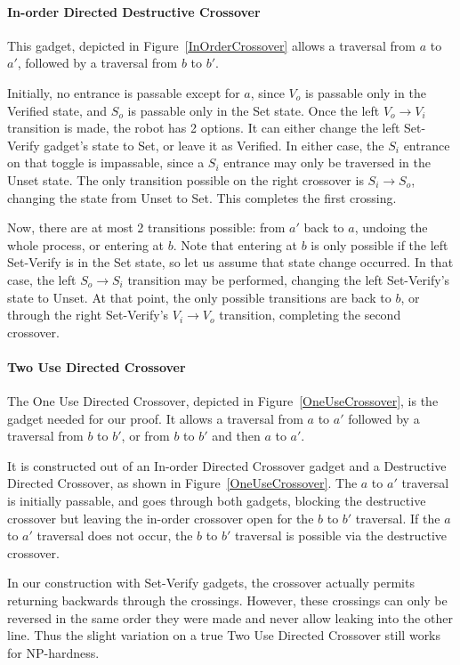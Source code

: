 \paragraph{In-order Directed Destructive Crossover} This gadget, depicted in Figure~\ref{InOrderCrossover} allows a traversal from $a$ to $a'$, followed by a traversal from $b$ to $b'$.

Initially, no entrance is passable except for $a$, since $V_o$ is passable only in the Verified state, and $S_o$ is
passable only in the Set state. Once the left $V_o \rightarrow V_i$ transition is made, the robot has 2 options.
It can either change the left Set-Verify gadget's state to Set, or leave it as Verified. In either case, the $S_i$
entrance on that toggle is impassable, since a $S_i$ entrance may only be traversed in the Unset state. The
only transition possible on the right crossover is $S_i \rightarrow S_o$, changing the state from Unset to Set.
This completes the first crossing.

Now, there are at most 2 transitions possible: from $a'$ back to $a$, undoing the whole process, or entering at $b$. Note that entering at $b$ is only possible if the left Set-Verify is in the Set state, so let us assume that state change occurred. In that case, the left $S_o \rightarrow S_i$ transition may be performed, changing the left Set-Verify's state to Unset. At that point, the only possible transitions are back to $b$, or through the right Set-Verify's
$V_i \rightarrow V_o$ transition, completing the second crossover.


\paragraph{Two Use Directed Crossover} 
The One Use Directed Crossover, depicted in Figure~\ref{OneUseCrossover}, is the gadget needed for our proof. It allows a traversal from $a$ to $a'$ followed by a traversal from $b$ to $b'$, or from $b$ to $b'$ and then $a$ to $a'$.

It is constructed out of an In-order Directed Crossover gadget and a Destructive Directed Crossover, as shown in Figure~\ref{OneUseCrossover}. The $a$ to $a'$ traversal is initially passable, and goes through both gadgets,
blocking the destructive crossover but leaving the in-order crossover open for the $b$ to $b'$ traversal. If the $a$ to $a'$ traversal does not occur, the $b$ to $b'$ traversal is possible via the destructive crossover.

In our construction with Set-Verify gadgets, the crossover actually permits returning backwards through the crossings. However, these crossings can only be reversed in the same order they were made and never allow leaking into the other line. Thus the slight variation on a true Two Use Directed Crossover still works for NP-hardness.

